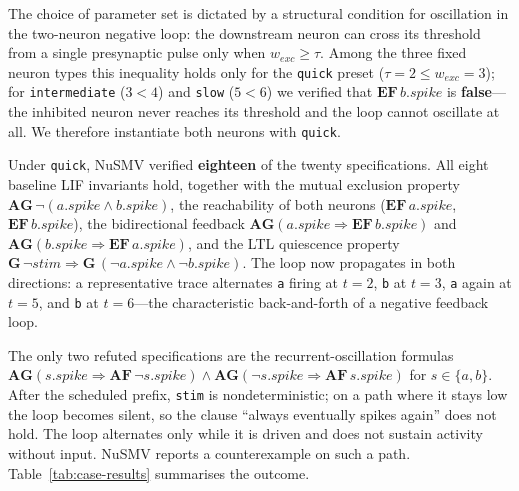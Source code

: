 \documentclass[
]{ceurart}
\begin{document}
The choice of parameter set is dictated by a structural condition for
oscillation in the two-neuron negative loop: the downstream neuron can
cross its threshold from a single presynaptic pulse only when
$w_{exc} \ge \tau$. Among the three fixed neuron types this inequality
holds only for the \texttt{quick} preset ($\tau = 2 \le w_{exc} = 3$); for
\texttt{intermediate} ($3 < 4$) and \texttt{slow} ($5 < 6$) we verified
that $\mathbf{EF}\, b.\mathit{spike}$ is \textbf{false}---the inhibited
neuron never reaches its threshold and the loop cannot oscillate at all.
We therefore instantiate both neurons with \texttt{quick}.

Under \texttt{quick}, NuSMV verified \textbf{eighteen} of the twenty
specifications. All eight baseline LIF invariants hold, together with the
mutual exclusion property
$\mathbf{AG}\,\neg(a.\mathit{spike} \land b.\mathit{spike})$, the
reachability of both neurons ($\mathbf{EF}\, a.\mathit{spike}$,
$\mathbf{EF}\, b.\mathit{spike}$), the bidirectional feedback
$\mathbf{AG}(a.\mathit{spike} \Rightarrow \mathbf{EF}\, b.\mathit{spike})$
and $\mathbf{AG}(b.\mathit{spike} \Rightarrow \mathbf{EF}\,
a.\mathit{spike})$, and the LTL quiescence property
$\mathbf{G}\,\neg\mathit{stim} \Rightarrow \mathbf{G}\,(\neg
a.\mathit{spike} \land \neg b.\mathit{spike})$. The loop now propagates in
both directions: a representative trace alternates \texttt{a} firing at
$t = 2$, \texttt{b} at $t = 3$, \texttt{a} again at $t = 5$, and \texttt{b}
at $t = 6$---the characteristic back-and-forth of a negative feedback loop.

The only two refuted specifications are the recurrent-oscillation formulas
$\mathbf{AG}(s.\mathit{spike} \Rightarrow \mathbf{AF}\,\neg s.\mathit{spike})
\land \mathbf{AG}(\neg s.\mathit{spike} \Rightarrow \mathbf{AF}\,
s.\mathit{spike})$ for $s \in \{a, b\}$. After the scheduled prefix,
\texttt{stim} is nondeterministic; on a path where it stays low the loop
becomes silent, so the clause ``always eventually spikes again'' does not
hold. The loop alternates only while it is driven and does not sustain
activity without input. NuSMV reports a counterexample on such a path.
Table~\ref{tab:case-results} summarises the outcome.
\end{document}
